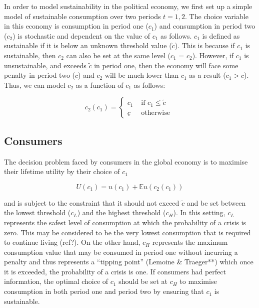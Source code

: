 \documentclass[11pt,preprint, authoryear]{elsarticle}
\numberwithin{equation}{section}
\numberwithin{figure}{section}
\numberwithin{table}{section}
\begin{document}
In order to model sustainability in the political economy, we first set
up a simple model of sustainable consumption over two periods
\(t = 1, 2\). The choice variable in this economy is consumption in
period one (\(c_1\)) and consumption in period two (\(c_2\)) is
stochastic and dependent on the value of \(c_1\) as follows. \(c_1\) is
defined as sustainable if it is below an unknown threshold value
(\(\tilde{c}\)). This is because if \(c_1\) is sustainable, then \(c_2\)
can also be set at the same level (\(c_1\) = \(c_2\)). However, if
\(c_1\) is unsustainable, and exceeds \(\tilde{c}\) in period one, then
the economy will face some penalty in period two (\(\underline{c}\)) and
\(c_2\) will be much lower than \(c_1\) as a result
(\(c_1> \underline{c}\)). Thus, we can model \(c_2\) as a function of
\(c_1\) as follows:

\[
c_2\left(c_1\right)= \begin{cases}c_1 & \text { if } c_1 \leq \tilde{c} \\ \underline{c} & \text { otherwise }\end{cases}
\]

\hypertarget{consumers}{%
\subsection*{Consumers}\label{consumers}}

The decision problem faced by consumers in the global economy is to
maximise their lifetime utility by their choice of \(c_1\)

\[
U\left(c_1\right)=u\left(c_1\right)+\mathbb{E} u\left(c_2\left(c_1\right)\right)
\]

and is subject to the constraint that it should not exceed \(\tilde{c}\)
and be set between the lowest threshold (\(c_L\)) and the highest
threshold (\(c_H\)). In this setting, \(c_L\) represents the safest
level of consumption at which the probability of a crisis is zero. This
may be considered to be the very lowest consumption that is required to
continue living (ref?). On the other hand, \(c_H\) represents the
maximum consumption value that may be consumed in period one without
incurring a penalty and thus represents a ``tipping point'' (Lemoine \&
Traeger**) which once it is exceeded, the probability of a crisis is
one. If consumers had perfect information, the optimal choice of \(c_1\)
should be set at \(c_H\) to maximise consumption in both period one and
period two by ensuring that \(c_1\) is sustainable.
\end{document}
